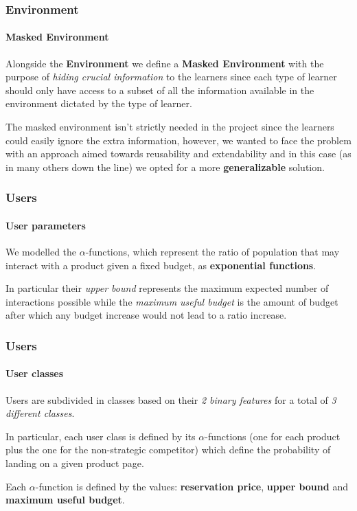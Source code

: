 
\begin{frame}

\frametitle{Environment}
\framesubtitle{Masked Environment}

Alongside the \textbf{Environment} we define a \textbf{Masked Environment} with the purpose of \textit{hiding crucial information} to the learners since each type of learner should only have access to a subset of all the information available in the environment dictated by the type of learner.

The masked environment isn't strictly needed in the project since the learners could easily ignore the extra information, however, we wanted to face the problem with an approach aimed towards reusability and extendability and in this case (as in many others down the line) we opted for a more \textbf{generalizable} solution.

\end{frame}


\begin{frame}

\frametitle{Users}
\framesubtitle{User parameters}

We modelled the $\alpha$-functions, which represent the ratio of population that may interact with a product given a fixed budget, as \textbf{exponential functions}.

In particular their \textit{upper bound} represents the maximum expected number of interactions possible while the \textit{maximum useful budget} is the amount of budget after which any budget increase would not lead to a ratio increase.

\end{frame}


\begin{frame}

\frametitle{Users}
\framesubtitle{User classes}

Users are subdivided in classes based on their \textit{2 binary features} for a total of \textit{3 different classes}.

In particular, each user class is defined by its $\alpha$-functions (one for each product plus the one for the non-strategic competitor) which define the probability of landing on a given product page.

Each $\alpha$-function is defined by the values: \textbf{reservation price}, \textbf{upper bound} and \textbf{maximum useful budget}.

\end{frame}

